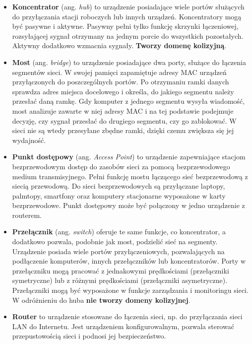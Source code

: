 \begin{itemize}
	\item \textbf{Koncentrator} (ang. \textit{hub}) to urządzenie posiadające wiele portów służących do przyłączania stacji roboczych lub innych urządzeń. Koncentratory mogą być pasywne i aktywne. Pasywny pełni tylko funkcję skrzynki łączeniowej, rozsyłającej sygnał otrzymany na jednym porcie do wszystkich pozostałych. Aktywny dodatkowo wzmacnia sygnały. \textbf{Tworzy domenę kolizyjną}.

	\item \textbf{Most} (ang. \textit{bridge}) to urządzenie posiadające dwa porty, służące do łączenia segmentów sieci. W swojej pamięci zapamiętuje adresy MAC urządzeń przyłączonych do poszczególnych portów. Po otrzymaniu ramki danych sprawdza adres miejsca docelowego i określa, do jakiego segmentu należy przesłać daną ramkę. Gdy komputer z jednego segmentu wysyła wiadomość, most analizuje zawarte w niej adresy MAC i na tej podstawie podejmuje decyzję, czy sygnał przesłać do drugiego segmentu, czy go zablokować. W sieci nie są wtedy przesyłane zbędne ramki, dzięki czemu zwiększa się jej wydajność.

	\item \textbf{Punkt dostępowy} (ang. \textit{Access Point}) to urządzenie zapewniające stacjom bezprzewodowym dostęp do zasobów sieci za pomocą bezprzewodowego medium transmisyjnego. Pełni funkcję mostu łączącego sieć bezprzewodową z siecią przewodową. Do sieci bezprzewodowych są przyłączane laptopy, palmtopy, smartfony oraz komputery stacjonarne wyposażone w karty bezprzewodowe. Punkt dostępowy może być połączony w jedno urządzenie z routerem.

	\item \textbf{Przełącznik} (ang. \textit{switch}) oferuje te same funkcje, co koncentrator, a dodatkowo pozwala, podobnie jak most, podzielić sieć na segmenty. Urządzenie posiada wiele portów przyłączeniowych, pozwalających na podłączenie komputerów, innych przełączników lub koncentratorów. Porty w przełączniku mogą pracować z jednakowymi prędkościami (przełączniki symetryczne) lub z różnymi prędkościami (przełączniki asymetryczne). Przełączniki mogą być wyposażone w funkcje zarządzania i monitoringu sieci. W odróżnieniu do huba \textbf{nie tworzy domeny kolizyjnej}.

	\item \textbf{Router} to urządzenie stosowane do łączenia sieci, np. do przyłączania sieci LAN do Internetu. Jest urządzeniem konfigurowalnym, pozwala sterować przepustowością sieci i podnosi jej bezpieczeństwo.


\end{itemize}
